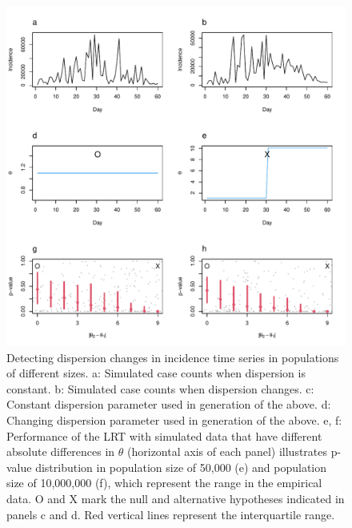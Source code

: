\documentclass[10pt,letterpaper]{article}
\begin{document}
\begin{figure}[!h]
\includegraphics[width=1\textwidth]{fig1}
\caption{
Detecting dispersion changes in incidence time series in populations of different sizes. a: Simulated case counts when dispersion is constant. b: Simulated case counts when dispersion changes. c: Constant dispersion parameter used in generation of the above. d: Changing dispersion parameter used in generation of the above. e, f: Performance of the LRT with simulated data that have different absolute differences in \begin{math}\theta\end{math} (horizontal axis of each panel) illustrates p-value distribution in population size of 50,000 (e) and population size of 10,000,000 (f), which represent the range in the empirical data. O and X mark the null and alternative hypotheses indicated in panels c and d. Red vertical lines represent the interquartile range. 
 }
\label{fig1}
\end{figure}
\end{document}
